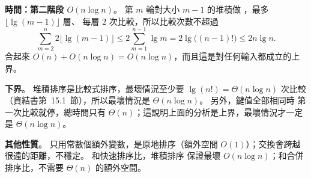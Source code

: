 \begin{pastsoln}
\textbf{時間：第二階段 $O(n \log n)$}。 第 $m$ 輪對大小 $m - 1$ 的堆積做 ，最多 $\lfloor \lg(m - 1) \rfloor$ 層、
每層 $2$ 次比較，所以比較次數不超過
\[
\sum_{m=2}^{n} 2\lfloor \lg(m - 1) \rfloor \le 2\sum_{m=1}^{n-1} \lg m = 2\lg\bigl((n-1)!\bigr) \le 2n \lg n .
\]
合起來 $O(n) + O(n \log n) = O(n \log n)$，而且這是對任何輸入都成立的上界。

\textbf{下界}。 堆積排序是比較式排序，最壞情況至少要 $\lg(n!) = \Theta(n \log n)$ 次比較（資結書第~15.1~節），所以最壞情況是
$\Theta(n \log n)$。 另外，鍵值全部相同時  第一次比較就停，總時間只有 $\Theta(n)$；這說明上面的分析是上界，最壞情況才一定是
$\Theta(n \log n)$。

\textbf{其他性質}。 只用常數個額外變數，是原地排序（額外空間 $O(1)$）；交換會跨越很遠的距離，不穩定。 和快速排序比，堆積排序
保證最壞 $O(n \log n)$；和合併排序比，不需要 $\Theta(n)$ 的額外空間。
\end{pastsoln}
